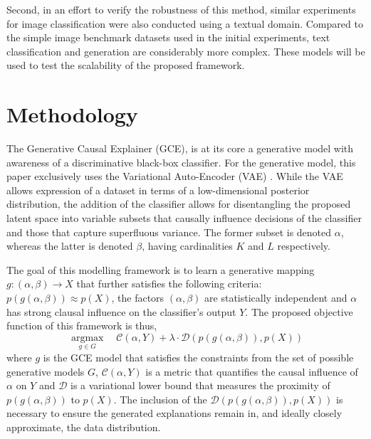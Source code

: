 Second, in an effort to verify the robustness of this method, similar experiments for image classification were also conducted using a textual domain. Compared to the simple image benchmark datasets used in the initial experiments, text classification and generation are considerably more complex. These models will be used to test the scalability of the proposed framework.


\section{Methodology}

The Generative Causal Explainer (GCE), is at its core a generative model with awareness of a discriminative black-box classifier. For the generative model, this paper exclusively uses the Variational Auto-Encoder (VAE) \cite{kingma2014autoencoding}. While the VAE allows expression of a dataset in terms of a low-dimensional posterior distribution, the addition of the classifier allows for disentangling the proposed latent space into variable subsets that causally influence decisions of the classifier and those that capture superfluous variance. The former subset is denoted $\alpha$, whereas the latter is denoted  $\beta$, having cardinalities $K$ and $L$ respectively. 

The goal of this modelling framework is to learn a generative mapping $g:(\alpha, \beta)\rightarrow X$ that further satisfies the following criteria: $p(g(\alpha, \beta)) \approx p(X)$, the factors $(\alpha, \beta)$ are statistically independent and $\alpha$ has strong clausal influence on the classifier's output $Y$. The proposed objective function of this framework is thus,
\begin{equation}
	\mathop{\text{argmax}}  \limits_{g \in G}  \quad \mathcal{C}(\alpha, Y) + \lambda \cdot \mathcal{D}(p(g(\alpha, \beta)), p(X))
	\label{object} 
\end{equation}
where $g$ is the GCE model that satisfies the constraints from the set of possible generative models $G$, $\mathcal{C}(\alpha, Y)$ is a metric that quantifies the causal influence of $\alpha$  on $Y$ and $\mathcal{D}$ is a variational lower bound that measures the proximity of $p(g(\alpha, \beta))$ to $p(X)$. The inclusion of the $\mathcal{D}(p(g(\alpha, \beta)), p(X))$ is necessary to ensure the generated explanations remain in, and ideally closely approximate, the data distribution. 

